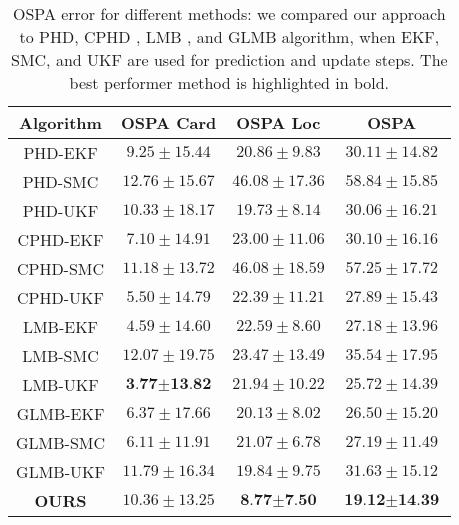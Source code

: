 \documentclass[runningheads]{llncs}
\begin{document}
\begin{table}[t]
\small{
\begin{center}
\begin{tabular}{c | c c c} 
Algorithm & OSPA Card & OSPA Loc & OSPA \\
\hline
PHD-EKF & $9.25 \pm 15.44$ & $20.86 \pm 9.83$ & $30.11 \pm 14.82$ \\
PHD-SMC & $12.76 \pm 15.67$ & $46.08 \pm 17.36$ & $58.84 \pm 15.85$ \\
PHD-UKF & $10.33 \pm 18.17$ & $19.73 \pm 8.14$ & $30.06 \pm 16.21$ \\
\hdashline
CPHD-EKF & $7.10 \pm 14.91$ & $23.00 \pm 11.06$ & $30.10 \pm 16.16$ \\
CPHD-SMC & $11.18 \pm 13.72$ & $46.08 \pm 18.59$ & $57.25 \pm 17.72$ \\
CPHD-UKF & $5.50 \pm 14.79$ & $22.39 \pm 11.21$ & $27.89 \pm 15.43$ \\
\hdashline
LMB-EKF & $4.59 \pm 14.60$ & $22.59 \pm 8.60$ & $27.18 \pm 13.96$ \\
LMB-SMC & $12.07 \pm 19.75$ & $23.47 \pm 13.49$ & $35.54 \pm 17.95$ \\
LMB-UKF & $\textbf{3.77} \pm \textbf{13.82}$ & $21.94 \pm 10.22$ & $25.72 \pm 14.39$ \\
\hdashline
GLMB-EKF & $6.37 \pm 17.66$ & $20.13 \pm 8.02$ & $26.50 \pm 15.20$ \\
GLMB-SMC & $6.11 \pm 11.91$ & $21.07 \pm 6.78$ & $27.19 \pm 11.49$ \\
GLMB-UKF & $11.79 \pm 16.34$ & $19.84 \pm 9.75$ & $31.63 \pm 15.12$ \\
\hdashline
\textbf{OURS} & $10.36 \pm 13.25$ & $\textbf{8.77} \pm \textbf{7.50}$ & $\textbf{19.12} \pm \textbf{14.39}$ \\
\end{tabular}
\end{center}
}


\caption{OSPA error for different methods: we compared our approach to PHD, CPHD \cite{Nagappa:2017,Mahler:2007}, LMB \cite{Reuter:2014}, and GLMB \cite{Vo:2014,Vo:2017} algorithm, when EKF, SMC, and UKF are used for prediction and update steps. The best performer method is highlighted in bold.}
\label{tab:table1}
\end{table}
\end{document}
